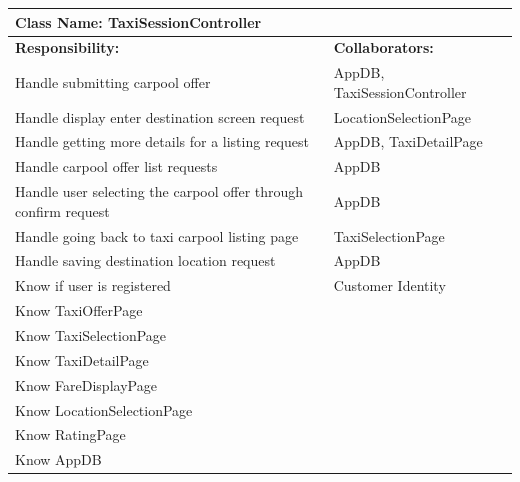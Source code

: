 \documentclass[]{article}
\begin{document}
\begin{table}[ht]
\centering
\begin{tabular}{|p{6cm}|p{6cm}|}
\hline 
 \multicolumn{2}{|l|}{\textbf{Class Name: TaxiSessionController}} \\
\hline
\textbf{Responsibility:} & \textbf{Collaborators:} \\
\hline
Handle submitting carpool offer & AppDB, TaxiSessionController\\ \hline
Handle display enter destination screen request & LocationSelectionPage\\ \hline
Handle getting more details for a listing request & AppDB, TaxiDetailPage\\ \hline
Handle carpool offer list requests & AppDB\\ \hline
Handle user selecting the carpool offer through confirm request & AppDB\\ \hline 
Handle going back to taxi carpool listing page & TaxiSelectionPage\\ \hline
Handle saving destination location request & AppDB\\ \hline
Know if user is registered & Customer Identity\\ \hline
Know TaxiOfferPage & \\ \hline 
Know TaxiSelectionPage & \\ \hline
Know TaxiDetailPage & \\ \hline
Know FareDisplayPage & \\ \hline
Know LocationSelectionPage & \\ \hline
Know RatingPage & \\ \hline
Know AppDB & \\ \hline
\end{tabular}
\end{table}
\end{document}
